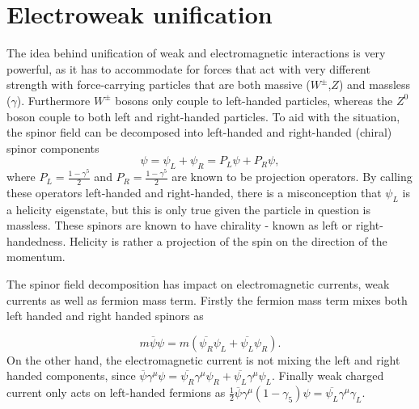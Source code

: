\section{Electroweak unification}
\label{weak}
The idea behind unification of weak and electromagnetic interactions is very powerful, as it has to accommodate for forces that act with very different strength with force-carrying particles that are both massive ($W^{\pm}$,$Z$) and massless ($\gamma$). Furthermore $W^{\pm}$ bosons only couple to left-handed particles, whereas the $Z^{0}$ boson couple to both left and right-handed particles. 
To aid with the situation, the spinor field can be decomposed into left-handed and right-handed (chiral) spinor components
\begin{equation}
	\psi=\psi_{L}+\psi_{R} = P_{L}\psi + P_{R}\psi,
\end{equation}
where $P_{L} =\frac{1-\gamma^{5}}{2}$ and $P_{R}=\frac{1-\gamma^{5}}{2}$ are known to be projection operators. By calling these operators left-handed and right-handed, there is a misconception that $\psi_{L}$ is a helicity eigenstate, but this is only true given the particle in question is massless. These spinors are known to have chirality - known as left or right-handedness. Helicity is rather a projection of the spin on the direction of the momentum.

The spinor field decomposition has impact on electromagnetic currents, weak currents as well as fermion mass term. Firstly the fermion mass term mixes both left handed and right handed spinors as 

\begin{equation}
	m\overline{\psi}\psi=m(\overline{\psi_{R}}\psi_{L} + \overline{\psi_{L}}\psi_{R}).
\label{eq:mixingpsi}
\end{equation}	
On the other hand, the electromagnetic current is not mixing the left and right handed components, since $\overline{\psi}\gamma^{\mu}\psi=\overline{\psi_{R}}\gamma^{\mu}\psi_{R} + \overline{\psi_{L}}\gamma^{\mu}\psi_{L}$. Finally weak charged current only acts on left-handed fermions as $\frac{1}{2}\overline{\psi}\gamma^{\mu}(1-\gamma_{5})\psi = \overline{\psi_{L}}\gamma^{\mu}\gamma_{L}$.   


